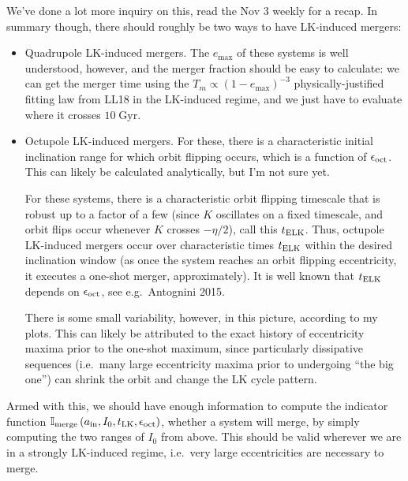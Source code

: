 \documentclass[10pt]{article}%
\newcommand*{\p}[1]{\left(#1\right)}
\begin{document}
We've done a lot more inquiry on this, read the Nov 3 weekly for a recap. In
summary though, there should roughly be two ways to have LK-induced mergers:
\begin{itemize}
    \item Quadrupole LK-induced mergers. The $e_{\max}$ of these systems is well
        understood, however, and the merger fraction should be easy to
        calculate: we can get the merger time using the $T_m \propto \p{1 -
        e_{\max}}^{-3}$ physically-justified fitting law from LL18 in the
        LK-induced regime, and we just have to evaluate where it crosses
        $10\;\mathrm{Gyr}$.

    \item Octupole LK-induced mergers. For these, there is a characteristic
        initial inclination range for which orbit flipping occurs, which is a
        function of $\epsilon_{\rm oct}$. This can likely be calculated
        analytically, but I'm not sure yet.

        For these systems, there is a characteristic orbit flipping timescale
        that is robust up to a factor of a few (since $K$ oscillates on a fixed
        timescale, and orbit flips occur whenever $K$ crosses $-\eta/2$), call
        this $t_{\rm ELK}$. Thus, octupole LK-induced mergers occur over
        characteristic times $t_{\rm ELK}$ within the desired inclination window
        (as once the system reaches an orbit flipping eccentricity, it executes
        a one-shot merger, approximately). It is well known that $t_{\rm ELK}$
        depends on $\epsilon_{\rm oct}$, see e.g.\ Antognini 2015.

        There is some small variability, however, in this picture, according to
        my plots. This can likely be attributed to the exact history of
        eccentricity maxima prior to the one-shot maximum, since particularly
        dissipative sequences (i.e.\ many large eccentricity maxima prior to
        undergoing ``the big one'') can shrink the orbit and change the LK cycle
        pattern.
\end{itemize}

Armed with this, we should have enough information to compute the indicator
function $\mathbb{I}_{\rm merge}\p{a_{\rm in}, I_0, t_{\rm LK}, \epsilon_{\rm
oct}}$, whether a system will merge, by simply computing the two ranges of $I_0$
from above. This should be valid wherever we are in a strongly LK-induced
regime, i.e.\ very large eccentricities are necessary to merge.
\end{document}
